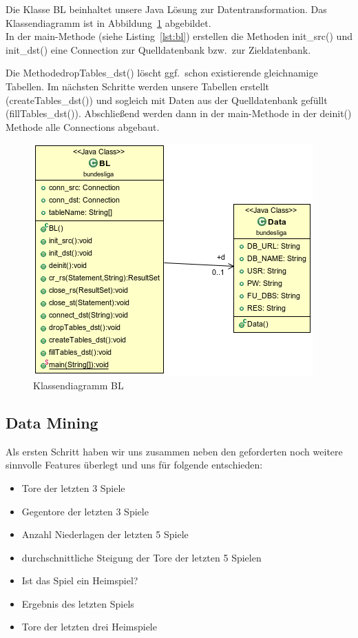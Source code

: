 \documentclass[
10pt,
a4paper
]{scrartcl}
\begin{document}
Die Klasse BL beinhaltet unsere Java L\"{o}sung zur Datentransformation. Das Klassendiagramm ist in Abbildung~\ref{fig4} abgebildet.\\

In der main-Methode (siehe Listing~\ref{lst:bl}) erstellen die Methoden init\_src() und init\_dst() eine Connection zur Quelldatenbank bzw.~zur Zieldatenbank.



Die MethodedropTables\_dst() l\"{o}scht ggf.~schon existierende gleichnamige Tabellen. Im n\"{a}chsten Schritte werden unsere Tabellen erstellt (createTables\_dst()) und sogleich mit Daten aus der Quelldatenbank gef\"{u}llt (fillTables\_dst()). Abschlie{\ss}end werden dann in der main-Methode in der deinit() Methode alle Connections abgebaut.

\begin{figure}[hb]
\centering
\includegraphics[scale=0.7]{BL.png}
\caption{Klassendiagramm BL}
\label{fig4}
\end{figure}

\subsection{Data Mining}
Als ersten Schritt haben wir uns zusammen neben den geforderten noch weitere sinnvolle Features überlegt
und uns für folgende entschieden:

 \begin{itemize}
  \item Tore der letzten 3 Spiele
  \item Gegentore der letzten 3 Spiele
  \item Anzahl Niederlagen der letzten 5 Spiele
  \item durchschnittliche Steigung der Tore der letzten 5 Spielen
  \item Ist das Spiel ein Heimspiel?
  \item Ergebnis des letzten Spiels
  \item Tore der letzten drei Heimspiele
 \end{itemize}
\end{document}

